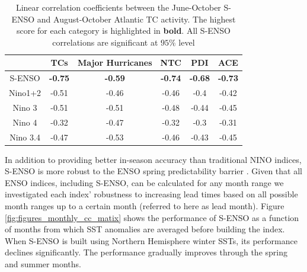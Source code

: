 \begin{table}
\begin{tabular}{cccccc}
\hline
&TCs & Major Hurricanes & NTC & PDI & ACE\\
\hline
S-ENSO & \textbf{-0.75} & \textbf{-0.59} &\textbf{-0.74} & \textbf{-0.68} & \textbf{-0.73}\\
Nino1+2 & -0.51 & -0.46 & -0.46 & -0.4 & -0.42\\
Nino 3 & -0.51 & -0.51 & -0.48 & -0.44 & -0.45\\
Nino 4 & -0.32 & -0.47 & -0.32 & -0.3 & -0.31\\
Nino 3.4 & -0.47 & -0.53 & -0.46 & -0.43 & -0.45\\
\hline
\end{tabular}
\caption{Linear correlation coefficients between the June-October S-ENSO and August-October Atlantic TC activity. The highest score for each category is highlighted in \textbf{bold}. All S-ENSO correlations are significant at $95\%$ level}
\label{ref:lin_corr}
\end{table}

In addition to providing better in-season accuracy than traditional NINO indices, S-ENSO is more robust to the ENSO spring predictability barrier \cite{webster1992}. Given that all ENSO indices, including S-ENSO, can be calculated for any month range we investigated each index' robustness to increasing lead times based on all possible month ranges up to a certain month (referred to here as lead month).
Figure \ref{fig:figures_monthly_cc_matix} shows the performance of S-ENSO as a function of months from which SST anomalies are averaged before building the index. When S-ENSO is built using Northern Hemisphere winter SSTs, its performance declines significantly. The performance gradually improves through the spring and summer months. 

